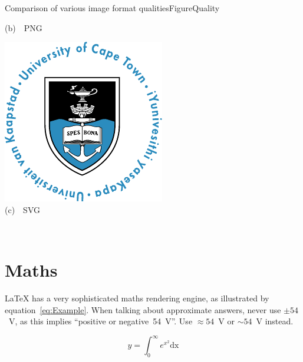 \begin{FigureEnvironment}{Comparison of various image format qualities}{FigureQuality}
\begin{minipage}[b]{0.3\textwidth}
    {\small (b)~~PNG}%
  \end{minipage}
  \hfill
  \begin{minipage}[b]{0.3\textwidth}\centering\setlength{\parindent}{0mm}
    \includegraphics[width=\textwidth]{../Figures/UCT.pdf}\\%
    {\small (c)~~SVG}%
  \end{minipage}
  \hfill\mbox{}\\[1mm]
\end{FigureEnvironment}%

\section{Maths}

\LaTeX{} has a very sophisticated maths rendering engine, as illustrated by equation~\ref{eq:Example}.  When talking about approximate answers, never use $\pm{54}$~V, as this implies ``positive or negative~54~V''.  Use $\approx{54}$~V or $\sim{54}$~V instead.

\begin{equation}
  y = \int_0^\infty e^{x^2} \mathrm{dx}
  \label{eq:Example}
\end{equation}


